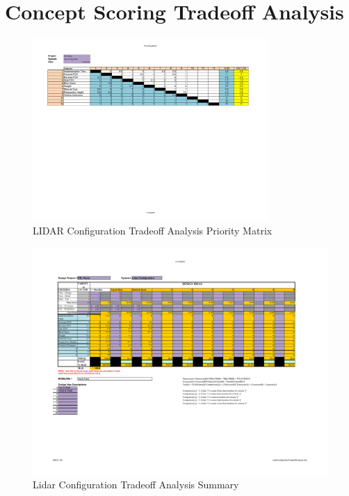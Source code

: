 \chapter{Concept Scoring Tradeoff Analysis} \label{App:tradeoff}

\begin{figure}[H]
\includegraphics[angle=90,width=0.8\textwidth]{TradeoffAnalysis/LIDAR1.pdf}
\caption[]{LIDAR Configuration Tradeoff Analysis Priority Matrix}
\label{fig:lidartradeoff1}
\end{figure}

\begin{figure}[H]
\includegraphics[angle=90,width=\textwidth]{TradeoffAnalysis/LIDAR2.pdf} 
\caption[]{Lidar Configuration Tradeoff Analysis Summary}
\label{fig:lidartradeoff}
\end{figure}

